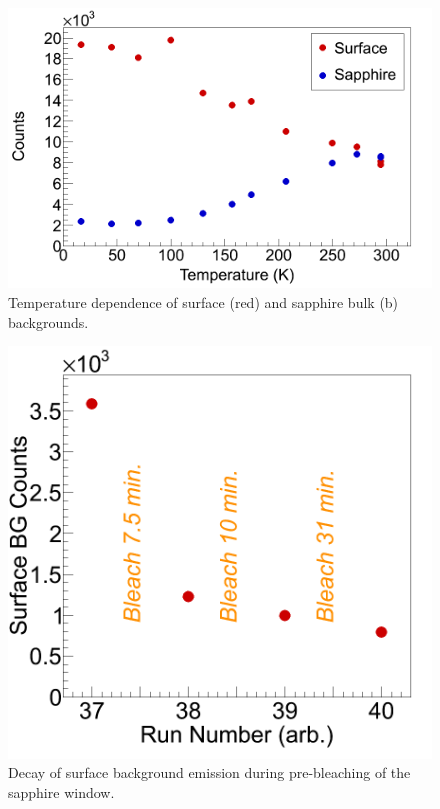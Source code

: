 \begin{figure} %
        \centering
                \includegraphics[width=.6\textwidth]{figures/bg_temp_dep.png}
                \caption{Temperature dependence of surface (red) and sapphire bulk (b) backgrounds.}
\label{fig:BGtempDependence}
\end{figure}

\begin{figure} %
        \centering
                \includegraphics[width=.4\textwidth]{figures/Bleach_SurfaceBG_20150807_part1.png}
                \caption{Decay of surface background emission during pre-bleaching of the sapphire window.}
\label{fig:surfBGbleach}
\end{figure}

